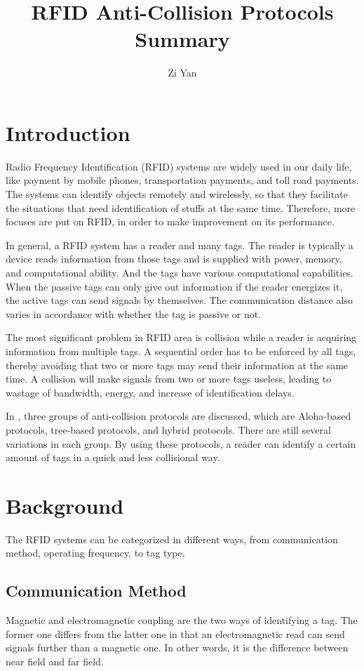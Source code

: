 \documentclass[12pt,letterpaper]{article}
\author{Zi Yan}
\title{RFID Anti-Collision Protocols Summary}
\date{}
\begin{document}
\maketitle

\section{Introduction}
Radio Frequency Identification (RFID) systems are widely used in
our daily life, like payment by mobile phones, transportation
payments, and toll road payments\cite{wiki}. The systems can
identify objects remotely and wirelessly, so that they facilitate 
the situations that need identification of stuffs at the same time.
Therefore, more focuses are put on RFID, in order to make 
improvement on its performance.

In general, a RFID system has a reader and many tags. The reader
is typically a device reads information from those tags and is 
supplied with power, memory, and computational ability. And
the tags have various computational capabilities. When the 
passive tags can only give out information if the reader energizes
it, the active tags can send signals by themselves. The communication
distance also varies in accordance with whether the tag is passive or
not.

The most significant problem in RFID area is collision while a
reader is acquiring information from multiple tags. A sequential
order has to be enforced by all tags, thereby avoiding that two or
more tags may send their information at the same time. A collision
will make signals from two or more tags useless, leading to wastage
of bandwidth, energy, and increase of identification delays\cite{survey}. 

In \cite{survey}, three groups of anti-collision protocols are
discussed, which are Aloha-based protocols, tree-based protocols,
and hybrid protocols. There are still several variations in each
group. By using these protocols, a reader can identify a certain
amount of tags in a quick and less collisional way.

\section{Background} 
The RFID systems can be categorized in different ways, from 
communication method, operating frequency, to tag type.

\subsection{Communication Method}
Magnetic and electromagnetic coupling are the two ways of
identifying a tag. The former one differs from the latter one
in that an electromagnetic read can send signals further
than  a magnetic one. In other words, it is the difference
between near field and far field.
\end{document}
